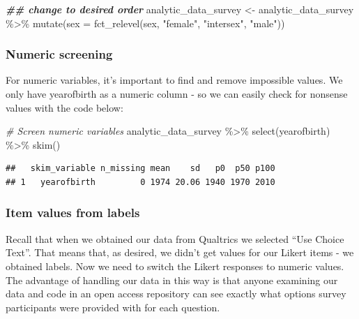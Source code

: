 \documentclass[
]{krantz}
\makeatletter
\newenvironment{Shaded}{\begin{snugshade}}{\end{snugshade}}
\newcommand{\AttributeTok}[1]{\textcolor[rgb]{0.61,0.61,0.61}{#1}}
\newcommand{\CommentTok}[1]{\textcolor[rgb]{0.37,0.37,0.37}{\textit{#1}}}
\newcommand{\DocumentationTok}[1]{\textcolor[rgb]{0.37,0.37,0.37}{\textbf{\textit{#1}}}}
\newcommand{\FunctionTok}[1]{\textcolor[rgb]{0,0,0}{#1}}
\newcommand{\NormalTok}[1]{#1}
\newcommand{\OtherTok}[1]{\textcolor[rgb]{0.37,0.37,0.37}{#1}}
\newcommand{\SpecialCharTok}[1]{\textcolor[rgb]{0,0,0}{#1}}
\newcommand{\StringTok}[1]{\textcolor[rgb]{0.5,0.5,0.5}{#1}}
\newenvironment{kframe}{%
\medskip{}
\setlength{\fboxsep}{.8em}
 \def\at@end@of@kframe{}%
 \ifinner\ifhmode%
  \def\at@end@of@kframe{\end{minipage}}%
  \begin{minipage}{\columnwidth}%
 \fi\fi%
 \def\FrameCommand##1{\hskip\@totalleftmargin \hskip-\fboxsep
 \colorbox{shadecolor}{##1}\hskip-\fboxsep
     \hskip-\linewidth \hskip-\@totalleftmargin \hskip\columnwidth}%
 \MakeFramed {\advance\hsize-\width
   \@totalleftmargin\z@ \linewidth\hsize
   \@setminipage}}%
 {\par\unskip\endMakeFramed%
 \at@end@of@kframe}
\renewenvironment{Shaded}{\begin{kframe}}{\end{kframe}}
\makeatother
\begin{document}
\begin{Shaded}
\begin{Highlighting}[]
\DocumentationTok{\#\# change to desired order}
\NormalTok{analytic\_data\_survey }\OtherTok{\textless{}{-}}\NormalTok{ analytic\_data\_survey }\SpecialCharTok{\%\textgreater{}\%}
  \FunctionTok{mutate}\NormalTok{(}\AttributeTok{sex =} \FunctionTok{fct\_relevel}\NormalTok{(sex,}
                           \StringTok{"female"}\NormalTok{,}
                           \StringTok{"intersex"}\NormalTok{,}
                           \StringTok{"male"}\NormalTok{))}
\end{Highlighting}
\end{Shaded}

\hypertarget{numeric-screening-1}{%
\subsubsection{Numeric screening}\label{numeric-screening-1}}

For numeric variables, it's important to find and remove impossible values. We only have yearofbirth as a numeric column - so we can easily check for nonsense values with the code below:

\begin{Shaded}
\begin{Highlighting}[]
\CommentTok{\# Screen numeric variables}
\NormalTok{analytic\_data\_survey }\SpecialCharTok{\%\textgreater{}\%}
  \FunctionTok{select}\NormalTok{(yearofbirth) }\SpecialCharTok{\%\textgreater{}\%}
  \FunctionTok{skim}\NormalTok{()}
\end{Highlighting}
\end{Shaded}

\begin{verbatim}
##   skim_variable n_missing mean    sd   p0  p50 p100
## 1   yearofbirth         0 1974 20.06 1940 1970 2010
\end{verbatim}

\hypertarget{item-values-from-labels}{%
\subsubsection{Item values from labels}\label{item-values-from-labels}}

Recall that when we obtained our data from Qualtrics we selected ``Use Choice Text''. That means that, as desired, we didn't get values for our Likert items - we obtained labels. Now we need to switch the Likert responses to numeric values. The advantage of handling our data in this way is that anyone examining our data and code in an open access repository can see exactly what options survey participants were provided with for each question.
\end{document}
